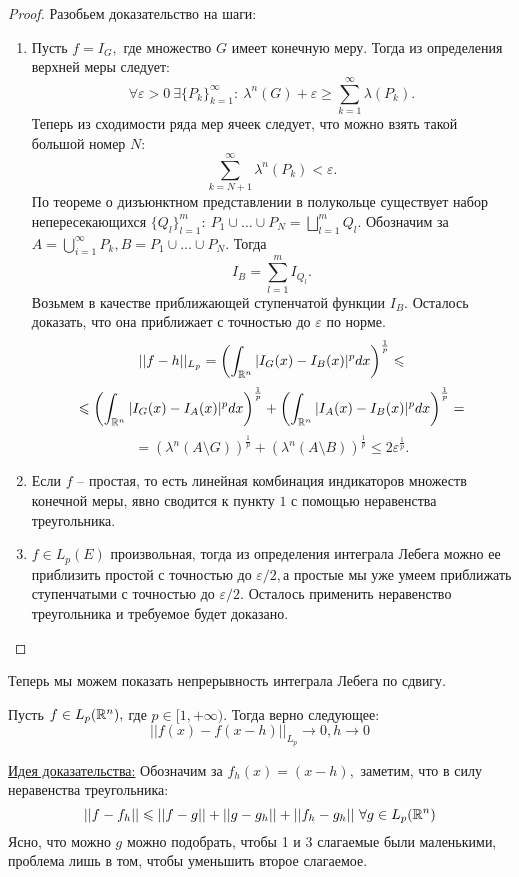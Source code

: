 \begin{proof} Разобьем доказательство на шаги:

\begin{enumerate}
    \item Пусть $f = I_{G},$ где множество $G$ имеет конечную меру. Тогда из определения верхней меры следует:
    $$\forall \varepsilon > 0 \ \exists \{P_{k}\}_{k = 1}^{\infty} : \ \lambda^n(G) + \varepsilon \geq \sum_{k  =1}^{\infty}\lambda(P_k).$$
    Теперь из сходимости ряда мер ячеек следует, что можно взять такой большой номер $N:$
    $$\sum_{k = N + 1}^{\infty} \lambda^n(P_k) < \varepsilon.$$
    По теореме о дизъюнктном представлении в полукольце существует набор непересекающихся $\{Q_l\}_{l = 1}^{m}: \ P_1 \cup \ldots \cup P_N = \bigsqcup_{l = 1}^mQ_l.$ Обозначим за $A = \bigcup_{i = 1}^{\infty} P_k,  B = P_1 \cup \ldots \cup P_N.$ Тогда  
    $$I_{B} = \sum_{l = 1}^{m}I_{Q_l}.$$
    Возьмем в качестве приближающей ступенчатой функции $I_{B}.$ Осталось доказать, что она приближает с точностью до $\varepsilon$ по норме.
    $$||f - h||_{L_p} = \left( \int_{\mathbb{R}^n} |I_G(x) - I_B(x)|^p dx\right)^{\frac{1}{p}} \leqslant$$
    $$\leqslant \left( \int_{\mathbb{R}^n} |I_G(x) - I_A(x)|^p dx\right)^{\frac{1}{p}} + \left( \int_{\mathbb{R}^n} |I_A(x) - I_B(x)|^p dx\right)^{\frac{1}{p}} = $$
    $$= \left( \lambda^n(A \setminus G)\right)^{\frac{1}{p}} + \left( \lambda^n(A \setminus B) \right)^{\frac{1}{p}} \leq 2\varepsilon^{\frac{1}{p}}.$$
    \item Если $f$ -- простая, то есть линейная комбинация индикаторов множеств конечной меры, явно сводится к пункту $1$ с помощью неравенства треугольника.
    \item $f \in L_p(E)$ произвольная, тогда из определения интеграла Лебега можно ее приблизить простой с точностью до $\varepsilon / 2, $а простые мы уже умеем приближать ступенчатыми с точностью до $\varepsilon / 2.$ Осталось применить неравенство треугольника и требуемое будет доказано.
\end{enumerate}
\end{proof}

Теперь мы можем показать непрерывность интеграла Лебега по сдвигу.
\begin{theorem}
    Пусть $f \in L_p(\mathbb{R}^n), $ где $p \in [1, +\infty).$ Тогда верно следующее:
    $$||f(x) - f(x - h)||_{L_p} \rightarrow 0, h \rightarrow 0$$
\end{theorem}

\underline{Идея доказательства:} Обозначим за $f_h(x) = (x - h),$ заметим, что в силу неравенства треугольника:
$$||f - f_h|| \leqslant ||f - g|| + ||g - g_h|| + ||f_h - g_h|| \ \forall g \in L_p(\mathbb{R}^n)$$
Ясно, что можно $g$ можно подобрать, чтобы 1 и 3 слагаемые были маленькими, проблема лишь в том, чтобы уменьшить второе слагаемое.  

